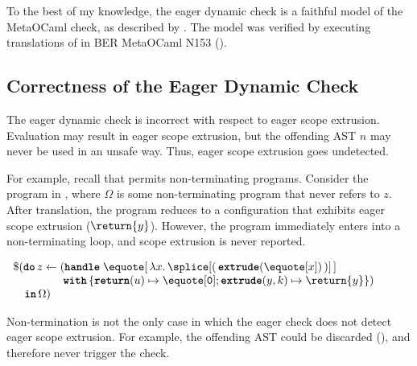 To the best of my knowledge, the eager dynamic check is a faithful model of the MetaOCaml check, as described by \citet{kiselyov-24}. The model was verified by executing translations of  in BER MetaOCaml N153 (). 

\subsection{Correctness of the Eager Dynamic Check}\label{subsection:eager-dynamic-correctness}
The eager dynamic check is incorrect with respect to eager scope extrusion. Evaluation may result in eager scope extrusion, but the offending AST $n$ may never be used in an unsafe way. Thus, eager scope extrusion goes undetected. 

For example, recall that \sourceLang{} permits non-terminating programs. Consider the \sourceLang{} program in , where $\Omega$ is some non-terminating program that never refers to $z$. After translation, the program reduces to a configuration that exhibits eager scope extrusion ($\return{y}$). However, the program immediately enters into a non-terminating loop, and scope extrusion is never reported.

\begin{code} 
 \begin{source}
  $\begin{array}{l}
      \$(\textbf{\texttt{do}} \, z \leftarrow (\textbf{\texttt{handle}} \; \equote[\, {\lambda x. \,\splice[(\,{{\textbf{\texttt{extrude}}(\equote[x])}}\,)]} \,] \\
      \quad\quad\quad\quad\,\; \textbf{\texttt{with}} \, \{ \textbf{\texttt{return}}(u) \mapsto {\equote[\texttt{0}]}; \textbf{\texttt{extrude}}(y, k) \mapsto {\return{y}}\})\\
      \quad \textbf{\texttt{in}} \, \Omega)
    \end{array}$
 \end{source}
 \label{listing:eager-scope-extrusion-unsafe}
\end{code}


Non-termination is not the only case in which the eager check does not detect eager scope extrusion. For example, the offending AST could be discarded (), and therefore never trigger the check.

